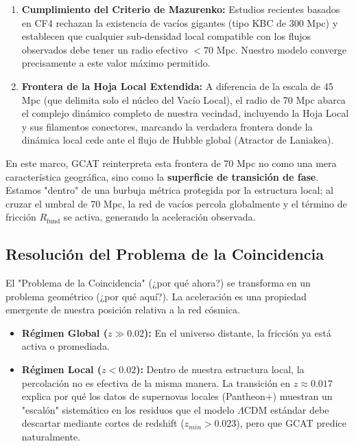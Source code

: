 \documentclass[12pt, a4paper]{article}
\theoremstyle{plain}
\theoremstyle{definition}
\begin{document}
\begin{enumerate}
    \item \textbf{Cumplimiento del Criterio de Mazurenko:} Estudios recientes basados en CF4 \cite{Mazurenko2024} rechazan la existencia de vacíos gigantes (tipo KBC de 300 Mpc) y establecen que cualquier sub-densidad local compatible con los flujos observados debe tener un radio efectivo $< 70$ Mpc. Nuestro modelo converge precisamente a este valor máximo permitido.
    
    \item \textbf{Frontera de la Hoja Local Extendida:} A diferencia de la escala de 45 Mpc (que delimita solo el núcleo del Vacío Local), el radio de 70 Mpc abarca el complejo dinámico completo de nuestra vecindad, incluyendo la Hoja Local y sus filamentos conectores, marcando la verdadera frontera donde la dinámica local cede ante el flujo de Hubble global (Atractor de Laniakea).
\end{enumerate}



En este marco, GCAT reinterpreta esta frontera de 70 Mpc no como una mera característica geográfica, sino como la \textbf{superficie de transición de fase}. Estamos "dentro" de una burbuja métrica protegida por la estructura local; al cruzar el umbral de 70 Mpc, la red de vacíos percola globalmente y el término de fricción $R_{\text{fund}}$ se activa, generando la aceleración observada.

\subsection{Resolución del Problema de la Coincidencia}

El "Problema de la Coincidencia" (¿por qué ahora?) se transforma en un problema geométrico (¿por qué aquí?). La aceleración es una propiedad emergente de nuestra posición relativa a la red cósmica.

\begin{itemize}
    \item \textbf{Régimen Global ($z \gg 0.02$):} En el universo distante, la fricción ya está activa o promediada.
    \item \textbf{Régimen Local ($z < 0.02$):} Dentro de nuestra estructura local, la percolación no es efectiva de la misma manera. La transición en \textbf{$z \approx 0.017$} explica por qué los datos de supernovas locales (Pantheon+) muestran un "escalón" sistemático en los residuos que el modelo $\Lambda$CDM estándar debe descartar mediante cortes de redshift ($z_{min} > 0.023$), pero que GCAT predice naturalmente.
\end{itemize}
\end{document}
